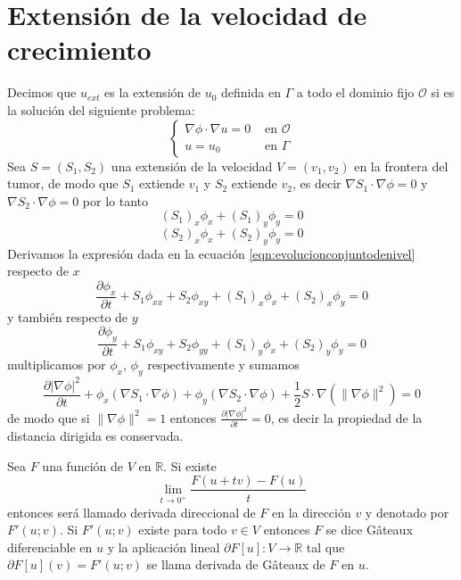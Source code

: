 \section{Extensión de la velocidad de crecimiento}
Decimos que $u_{ext}$ es la extensión de $u_0$ definida en $\Gamma$ a todo el dominio fijo $\mathcal{O}$ si es la solución del siguiente problema:
\begin{equation}
	\begin{cases}
		\nabla \phi \cdot \nabla u =0& \text{ en }\mathcal{O}\\
		u =u_0 &\text{ en }\Gamma
	\end{cases}	
	\label{eqn:extension}
\end{equation}
Sea $S=(S_1, S_2)$ una extensión de la velocidad $V=(v_1,v_2)$ en la frontera del tumor, de modo que $S_1$ extiende $v_1$ y $S_2$ extiende $v_2$, es decir  $\nabla S_1 \cdot \nabla\phi =0$ y $\nabla S_2 \cdot \nabla\phi =0$ por lo tanto
\[
(S_1)_x \phi_x +(S_1)_y \phi_y=0
\]
\[
(S_2)_x \phi_x +(S_2)_y \phi_y=0
\]
Derivamos la expresión dada en la ecuación \ref{eqn:evolucionconjuntodenivel} respecto de $x$
\[
\frac{ \partial\phi_x}{ \partial t} + S_1 \phi_{xx}  + S_2 \phi_{xy}  +  (S_1)_x \phi_{x}  + (S_2)_x \phi_{y} =0
\]
 y también respecto de $y$ 
\[
\frac{\partial \phi_y}{ \partial t} + S_1 \phi_{xy}  + S_2 \phi_{yy}  +  (S_1)_y \phi_{x}  + (S_2)_y \phi_{y} =0
\]
multiplicamos por $\phi_x$, $\phi_y$ respectivamente y sumamos
\[
\frac{\partial |\nabla \phi|^2}{ \partial t} + 
\phi_x(\nabla S_1 \cdot \nabla\phi ) + \phi_y(\nabla S_2 \cdot \nabla\phi )
+ \frac{1}{2} S\cdot \nabla (\|\nabla \phi\|^2)=0
\]
de modo que si $\|\nabla \phi\|^2=1$ entonces $\frac{\partial |\nabla \phi|^2}{ \partial t}=0$, es decir la propiedad de la distancia dirigida es conservada.

\begin{defi}
Sea $F$ una función de $V$ en $\mathbb{R}$. Si existe
\[
\lim_{t\to 0^+} \frac{F(u+tv)-F(u)}{t}
\]
entonces será llamado derivada direccional de $F$ en la dirección $v$ y denotado por $F'(u;v)$. Si $F'(u;v)$ existe para todo $v\in V$ entonces $F$ se dice G\^{a}teaux diferenciable en $u$ y la aplicación lineal $\partial F[u]:V\to\mathbb{R}$ tal que $\partial F[u](v)=F'(u;v)$ se llama derivada de G\^{a}teaux de $F$ en $u$.
\end{defi}

